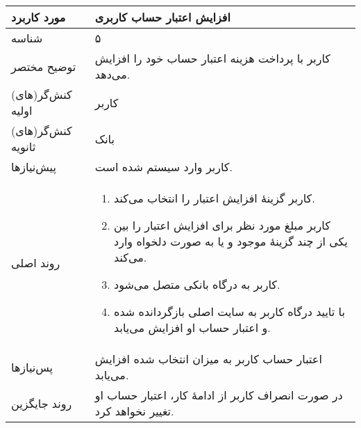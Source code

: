 \documentclass{article}
\begin{document}
\begin{center}
\bgroup
\def\arraystretch{1.5}
\begin{tabular} {|p{}|p{}|}
\hline
 مورد کاربرد & 
افزایش اعتبار حساب کاربری
\\ \hline
 شناسه &
۵
\\ \hline
توضیح مختصر &
کاربر با پرداخت هزینه اعتبار حساب خود را افزایش می‌دهد.
\\ \hline
کنش‌گر(های) اولیه &
کاربر
\\ \hline
کنش‌گر(های) ثانویه &
بانک
\\ \hline
پیش‌نیازها &
کاربر وارد سیستم شده است.
\\ \hline
روند اصلی &
\begin{enumerate}[nosep,topsep=0cm]
\item
کاربر گزینهٔ افزایش اعتبار را انتخاب می‌کند.
\item
کاربر مبلغ مورد نظر برای افزایش اعتبار را بین یکی از چند گزینهٔ موجود و یا به صورت دلخواه وارد می‌کند.
\item
کاربر به درگاه بانکی متصل می‌شود.
\item
با تایید درگاه کاربر به سایت اصلی بازگردانده شده و اعتبار حساب او افزایش می‌یابد.
\end{enumerate}
\\ \hline
پس‌نیازها &
اعتبار حساب کاربر به میزان انتخاب شده افزایش می‌یابد.
\\ \hline
روند جایگزین &
در صورت انصراف کاربر از ادامهٔ کار، اعتبار حساب او تغییر نخواهد کرد.
\\ \hline
\end{tabular}
\egroup
\end{center}

\newpage
\end{document}
